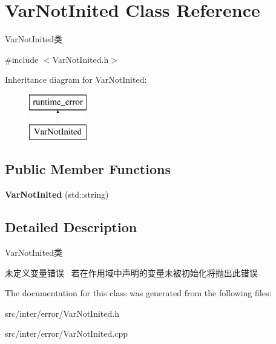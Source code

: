 \hypertarget{class_var_not_inited}{}\section{Var\+Not\+Inited Class Reference}
\label{class_var_not_inited}


Var\+Not\+Inited类  




{\ttfamily \#include $<$Var\+Not\+Inited.\+h$>$}

Inheritance diagram for Var\+Not\+Inited\+:\begin{figure}[H]
\begin{center}
\leavevmode
\includegraphics[height=2.000000cm]{class_var_not_inited}
\end{center}
\end{figure}
\subsection*{Public Member Functions}
\begin{DoxyCompactItemize}
\item 
\mbox{\label{class_var_not_inited_a14d78a6013df47440f2eba2074c1ef62}} 
{\bfseries Var\+Not\+Inited} (std\+::string)
\end{DoxyCompactItemize}


\subsection{Detailed Description}
Var\+Not\+Inited类 

未定义变量错误~\newline
若在作用域中声明的变量未被初始化将抛出此错误 

The documentation for this class was generated from the following files\+:\begin{DoxyCompactItemize}
\item 
src/inter/error/Var\+Not\+Inited.\+h\item 
src/inter/error/Var\+Not\+Inited.\+cpp\end{DoxyCompactItemize}
